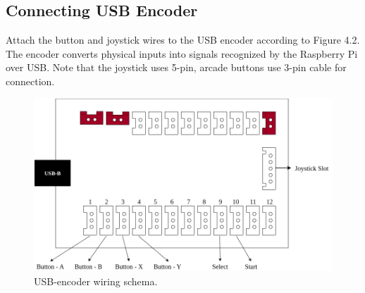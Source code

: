 \subsection{Connecting USB Encoder}
\label{subsec:connecting_usb_encoder}
Attach the button and joystick wires to the USB encoder according to Figure 4.2. The encoder converts physical inputs into signals recognized by the Raspberry Pi over USB.
 Note that the joystick uses 5-pin, arcade buttons use 3-pin cable for connection. 
\\
\begin{figure}[htb] 
	\centering  
	\includegraphics[scale=0.26]{F_Figures/usb_encoder_layout.png}
	\caption{USB-encoder wiring schema.}
	\label{fig:usb_encoder_layout}
\end{figure} 

